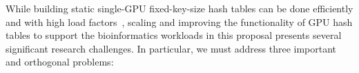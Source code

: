 






While building static single-GPU fixed-key-size hash tables can be done efficiently and with high load factors~\cite{Awad:2023:AAI}, scaling and improving the functionality of GPU hash tables to support the bioinformatics workloads in this proposal presents several significant research challenges. In particular, we must address three important and orthogonal problems:

